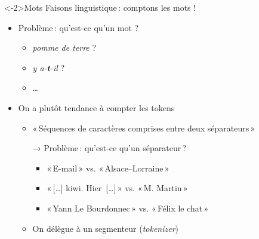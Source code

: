 \documentclass[hyperref={unicode}, xcolor={svgnames}, french]{beamer}
\begin{document}

\begin{frame}<-2>{Mots}
    Faisons  linguistique : comptons les mots !
    \begin{itemize}
        \item Problème : qu'est-ce qu'un mot ?
            \begin{itemize}
                \item \emph{pomme de terre} ?
                \item \emph{y a-\textbf{t}-il} ?
                \item …
            \end{itemize}
        \item On a plutôt tendance à compter les \alert{tokens}
            \begin{itemize}
                \item « Séquences de caractères comprises entre deux séparateurs »
                \item[→] Problème : qu'est-ce qu'un séparateur ? \begin{itemize}
                    \item « E-mail » vs. « Alsace–Lorraine »
                    \item « […] kiwi. Hier […] » vs. « M. Martin »
                    \item « Yann Le Bourdonnec » vs. « Félix le chat »
                \end{itemize}
                \item On délègue à un segmenteur (\emph{tokenizer})
            \end{itemize}
    \end{itemize}
\end{frame}
\end{document}
